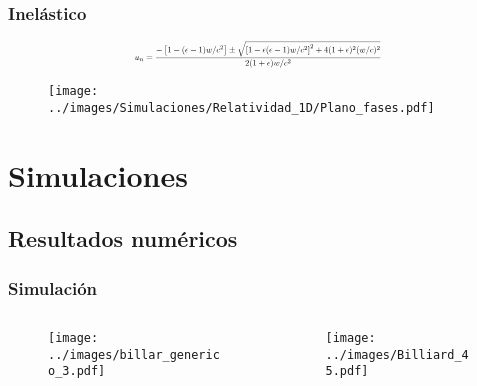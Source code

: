 \documentclass{beamer}
\begin{document}
\begin{frame}
    \frametitle[prueb1]{Inelástico} 
        \centering
        \vspace{-0.7cm}
            \begin{equation*}
                \scalebox{0.6}{$u_n = \dfrac{-\left[ 1 -  (\epsilon - 1)w/c^2 \right] \pm \sqrt{\left[ 1 - \epsilon (\epsilon - 1)w/c^2 \right]^2 + 4(1+\epsilon)^2(w/c)^2}}{2(1+\epsilon)w/c^2}$ }
            \end{equation*}
            \vspace{-0.7cm}
            \begin{figure}
                \centering
                \texttt{[image: ../images/Simulaciones/Relatividad\_1D/Plano\_fases.pdf]}
            \end{figure}
\end{frame}


\section{Simulaciones}
\subsection{Resultados numéricos}

\begin{frame}
    \frametitle[prueb1]{Simulación}
    \begin{columns}
        \hspace{-1cm}
        \begin{column}{0.5\textwidth}
            \begin{figure}
                \centering
                \texttt{[image: ../images/billar\_generico\_3.pdf]}
            \end{figure}  
        \end{column}
        \begin{column}{0.5\textwidth}
            \begin{figure}
                \centering
                \texttt{[image: ../images/Billiard\_45.pdf]}
            \end{figure}  
        \end{column}
    \end{columns}
\end{frame}
\end{document}
